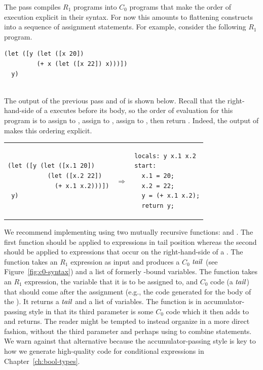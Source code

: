 \documentclass[11pt]{book}
\begin{document}
The  pass compiles $R_1$ programs into $C_0$
programs that make the order of execution explicit in their
syntax. For now this amounts to flattening  constructs into a
sequence of assignment statements. For example, consider the following
$R_1$ program.\\
\begin{minipage}{0.96\textwidth}
\begin{lstlisting}
(let ([y (let ([x 20])
         (+ x (let ([x 22]) x)))])
  y)
\end{lstlisting}
\end{minipage}\\
%
The output of the previous pass and of  is
shown below. Recall that the right-hand-side of a  executes
before its body, so the order of evaluation for this program is to
assign  to , assign  to , assign
 to , then return . Indeed, the
output of  makes this ordering explicit.\\
\begin{tabular}{lll}
\begin{minipage}{0.4\textwidth}
\begin{lstlisting}
(let ([y (let ([x.1 20]) 
           (let ([x.2 22])
             (+ x.1 x.2)))])
 y)
\end{lstlisting}
\end{minipage}
&
$\Rightarrow$
&
\begin{minipage}{0.4\textwidth}
\begin{lstlisting}
locals: y x.1 x.2
start:
  x.1 = 20;
  x.2 = 22;
  y = (+ x.1 x.2);
  return y;
\end{lstlisting}
\end{minipage}
\end{tabular}

We recommend implementing  using two mutually
recursive functions:  and
.  The first function should be applied to
expressions in tail position whereas the second should be applied to
expressions that occur on the right-hand-side of a .
%
The  function takes an $R_1$ expression as input
and produces a $C_0$ $\mathit{tail}$ (see Figure~\ref{fig:c0-syntax}) and a
list of formerly -bound variables.
%
The  function takes an $R_1$ expression, the
variable that it is to be assigned to, and $C_0$ code (a $\mathit{tail}$) that
should come after the assignment (e.g., the code generated for the
body of the ).  It returns a $\mathit{tail}$ and a list of
variables. The  function is in
accumulator-passing style in that its third parameter is some $C_0$
code which it then adds to and returns. The reader might be tempted to
instead organize  in a more direct fashion,
without the third parameter and perhaps using  to combine
statements. We warn against that alternative because the
accumulator-passing style is key to how we generate high-quality code
for conditional expressions in Chapter~\ref{ch:bool-types}.
\end{document}
